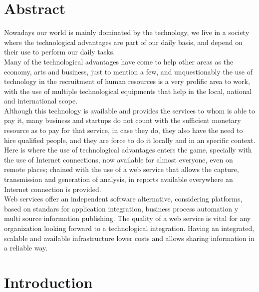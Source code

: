 \documentclass[12pt,letterpaper,titlepage]{book}
\begin{document}
\chapter{Abstract}

Nowadays our world is mainly dominated by the technology, we live in a society where the technological advantages are part of our daily basis, and depend on their use to perform our daily tasks.\\

Many of the technological advantages have come to help other areas as the economy, arts and business, just to mention a few, and unquestionably the use of technology in the recruitment of human resources is a very prolific area to work, with the use of multiple technological equipments that help in the local, national and international scope.\\

Although this technology is available and provides the services to whom is able to pay it, many business and startups do not count with the sufficient monetary resource as to pay for that service, in case they do, they also have the need to hire qualified people, and they are force to do it locally and in an specific context.\\

Here is where the use of technological advantages enters the game, specially with the use of Internet connections, now available for almost everyone, even on remote places; chained with the use of a web service that allows the capture, transmission and generation of analysis, in reports available everywhere an Internet connection is provided.\\

Web services offer an independent software alternative, considering platforms, based on standars for application integration, business process automation y multi source information publishing. The quality of a web service is vital for any organization looking forward to a technological integration. Having an integrated, scalable and available infrastructure lower costs and allows sharing information in a reliable way.\\
\chapter{Introduction}\label{cap1}
\end{document}
